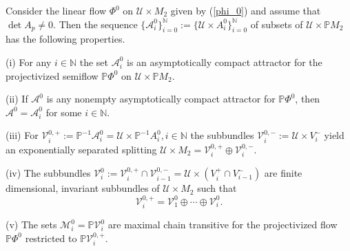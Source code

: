 \documentclass{siamltex}%
\begin{document}
\begin{proposition}
\label{Proposition_Selgrade_hom}Consider the linear flow $\Phi^{0}$ on
$\mathcal{U}\times M_{2}$ given by (\ref{phi_0}) and assume that $\det
A_{p}\not =0$. Then the sequence $\{\mathcal{A}_{i}^{0}\}_{i=0}^{\mathbb{N}%
}:=\{\mathcal{U}\times A_{i}^{0}\}_{i=0}^{\mathbb{N}}$ of subsets of
$\mathcal{U}\times\mathbb{P}M_{2}$ has the following properties.

(i) For any $i\in\mathbb{N}$ the set $\mathcal{A}_{i}^{0}$ is an
asymptotically compact attractor for the projectivized semiflow $\mathbb{P}%
\Phi^{0}$ on $\mathcal{U}\times\mathbb{P}M_{2}$.

(ii) If $\mathcal{A}^{0}$ is any nonempty asymptotically compact attractor for
$\mathbb{P}\Phi^{0}$, then $\mathcal{A}^{0}=\mathcal{A}_{i}^{0}$ for some
$i\in\mathbb{N}$.

(iii) For $\mathcal{V}_{i}^{0,+}:=\mathbb{P}^{-1}\mathcal{A}_{i}%
^{0}=\mathcal{U}\times\mathbb{P}^{-1}A_{i}^{0},i\in\mathbb{N}$ the subbundles
$\mathcal{V}_{i}^{0,-}:=\mathcal{U}\times V_{i}^{-}$ yield an exponentially
separated splitting $\mathcal{U}\times M_{2}=\mathcal{V}_{i}^{0,+}%
\oplus\mathcal{V}_{i}^{0,-}$.

(iv) The subbundles $\mathcal{V}_{i}^{0}:=\mathcal{V}_{i}^{0,+}\cap
\mathcal{V}_{i-1}^{0,-}=\mathcal{U}\times\left(  V_{i}^{+}\cap V_{i-1}%
^{-}\right)  $ are finite dimensional, invariant subbundles of $\mathcal{U}%
\times M_{2}$ such that%
\[
\mathcal{V}_{i}^{0,+}=\mathcal{V}_{1}^{0}\oplus\cdots\oplus\mathcal{V}_{i}%
^{0}.
\]


(v) The sets $\mathcal{M}_{i}^{0}=\mathbb{P}\mathcal{V}_{i}^{0}$ are maximal
chain transitive for the projectivized flow $\mathbb{P}\Phi^{0}$ restricted to
$\mathbb{P}\mathcal{V}_{i}^{0,+}$.
\end{proposition}
\end{document}
